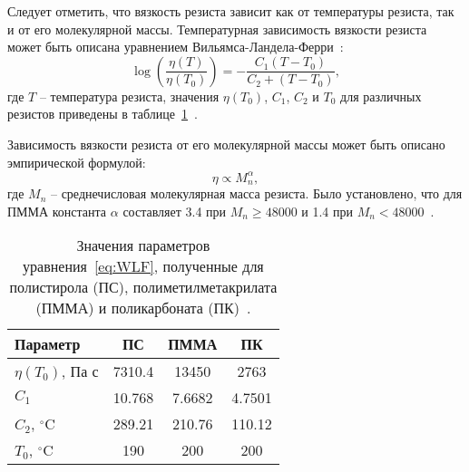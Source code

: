 \documentclass[12pt, letterpaper]{article}
\begin{document}
Следует отметить, что вязкость резиста зависит как от температуры резиста, так и от его молекулярной массы. Температурная зависимость вязкости резиста может быть описана уравнением Вильямса-Ландела-Ферри~\cite{bird1987dynamics_WLF}:
\begin{equation} \label{eq:WLF}
	\log \left( \frac{\eta(T)}{\eta(T_0)} \right) = -\frac{C_1(T-T_0)}{C_2+(T-T_0)},
\end{equation}
где $T$ -- температура резиста, значения $\eta(T_0)$, $C_1$, $C_2$ и $T_0$ для различных резистов приведены в таблице~\ref{table:WLF}~\cite{aho2008measurement_WLF}.

Зависимость вязкости резиста от его молекулярной массы может быть описано эмпирической формулой:
\begin{equation} \label{eq:3p4_3p1}
	\eta \propto M_n^\alpha,
\end{equation}
где $M_n$ -- среднечисловая молекулярная масса резиста. Было установлено, что для ПММА константа $\alpha$ составляет 3.4 при $M_n \geq 48 000$ и 1.4 при $M_n < 48 000$~\cite{Leveder_2010, Bueche_3p4_1p4}.

\begin{table}[h]
	\centering
	\caption{Значения параметров уравнения~\ref{eq:WLF}, полученные для полистирола (ПС), полиметилметакрилата (ПММА) и поликарбоната (ПК)~\cite{aho2008measurement_WLF}.}
	\begin{tabular}{l c c c}
		\hline \hline
		Параметр \hspace{2em} & ПС \hspace{2em} & ПММА \hspace{2em} & ПК \\ \hline
		$\eta(T_0)$, Па с \hspace{2em} & 7310.4 \hspace{2em} & 13450 \hspace{2em} & 2763 \\
		$C_1$ \hspace{2em} & 10.768 \hspace{2em} & 7.6682 \hspace{2em} & 4.7501 \\
		$C_2$, $^\circ$C \hspace{2em} & 289.21 \hspace{2em} & 210.76 \hspace{2em} & 110.12 \\
		$T_0$, $^\circ$C \hspace{2em} & 190 \hspace{2em} & 200 \hspace{2em} & 200 \\
		\hline \hline
	\end{tabular}
	\label{table:WLF}
\end{table}
\end{document}
